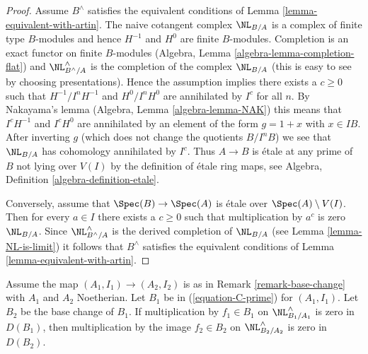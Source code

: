 \begin{proof}
Assume $B^\wedge$ satisfies the equivalent conditions of
Lemma \ref{lemma-equivalent-with-artin}.
The naive cotangent complex $\NL_{B/A}$ is a complex of finite type
$B$-modules and hence $H^{-1}$ and $H^0$ are finite $B$-modules.
Completion is an exact functor on finite $B$-modules (Algebra,
Lemma \ref{algebra-lemma-completion-flat}) and $\NL_{B^\wedge/A}^\wedge$
is the completion of the complex $\NL_{B/A}$ (this is easy to see
by choosing presentations).
Hence the assumption implies there exists a $c \geq 0$ such that
$H^{-1}/I^nH^{-1}$ and $H^0/I^nH^0$ are annihilated by $I^c$
for all $n$. By Nakayama's lemma (Algebra, Lemma \ref{algebra-lemma-NAK})
this means that $I^cH^{-1}$ and $I^cH^0$ are annihilated by an element
of the form $g = 1 + x$ with $x \in IB$. After inverting $g$
(which does not change the quotients $B/I^nB$)
we see that $\NL_{B/A}$ has cohomology annihilated by $I^c$. Thus
$A \to B$ is \'etale at any prime of $B$ not lying over $V(I)$
by the definition of \'etale ring maps, see
Algebra, Definition \ref{algebra-definition-etale}.

\medskip\noindent
Conversely, assume that $\Spec(B) \to \Spec(A)$ is \'etale over
$\Spec(A) \setminus V(I)$. Then for every $a \in I$ there exists
a $c \geq 0$ such that multiplication by $a^c$ is zero $\NL_{B/A}$.
Since $\NL_{B^\wedge/A}^\wedge$ is the derived completion of
$\NL_{B/A}$ (see Lemma \ref{lemma-NL-is-limit}) it follows that
$B^\wedge$ satisfies the equivalent conditions of
Lemma \ref{lemma-equivalent-with-artin}.
\end{proof}

\begin{lemma}
\label{lemma-zero-after-modding-out}
Assume the map $(A_1, I_1) \to (A_2, I_2)$ is as in
Remark \ref{remark-base-change} with $A_1$ and $A_2$ Noetherian.
Let $B_1$ be in (\ref{equation-C-prime}) for $(A_1, I_1)$.
Let $B_2$ be the base change of $B_1$.
If multiplication by $f_1 \in B_1$ on $\NL^\wedge_{B_1/A_1}$
is zero in $D(B_1)$, then multiplication by
the image $f_2 \in B_2$ on $\NL^\wedge_{B_2/A_2}$ is zero
in $D(B_2)$.
\end{lemma}

